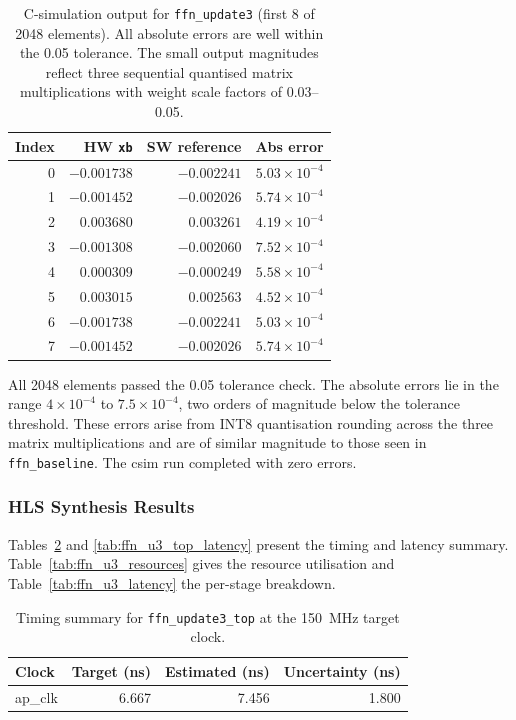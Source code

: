 \begin{table}[H]
  \centering
  \begin{tabular}{rrrr}
    \toprule
    Index & HW \texttt{xb} & SW reference & Abs error \\
    \midrule
    0 & $-0.001738$ & $-0.002241$ & $5.03 \times 10^{-4}$ \\
    1 & $-0.001452$ & $-0.002026$ & $5.74 \times 10^{-4}$ \\
    2 & $ 0.003680$ & $ 0.003261$ & $4.19 \times 10^{-4}$ \\
    3 & $-0.001308$ & $-0.002060$ & $7.52 \times 10^{-4}$ \\
    4 & $ 0.000309$ & $-0.000249$ & $5.58 \times 10^{-4}$ \\
    5 & $ 0.003015$ & $ 0.002563$ & $4.52 \times 10^{-4}$ \\
    6 & $-0.001738$ & $-0.002241$ & $5.03 \times 10^{-4}$ \\
    7 & $-0.001452$ & $-0.002026$ & $5.74 \times 10^{-4}$ \\
    \bottomrule
  \end{tabular}
  \caption{C-simulation output for \texttt{ffn\_update3} (first 8 of 2048
           elements). All absolute errors are well within the
           \num{0.05} tolerance. The small output magnitudes reflect
           three sequential quantised matrix multiplications with weight
           scale factors of \num{0.03}--\num{0.05}.}
  \label{tab:ffn_u3_csim}
\end{table}

All 2048 elements passed the \num{0.05} tolerance check. The absolute errors
lie in the range $4 \times 10^{-4}$ to $7.5 \times 10^{-4}$, two orders of
magnitude below the tolerance threshold. These errors arise from INT8
quantisation rounding across the three matrix multiplications and are of
similar magnitude to those seen in \texttt{ffn\_baseline}. The csim run
completed with zero errors.

\subsubsection{HLS Synthesis Results}
\label{subsubsec:ffn_update3_csyn}

Tables~\ref{tab:ffn_u3_timing} and \ref{tab:ffn_u3_top_latency}
present the timing and latency summary. Table~\ref{tab:ffn_u3_resources}
gives the resource utilisation and Table~\ref{tab:ffn_u3_latency} the
per-stage breakdown.

\begin{table}[H]
  \centering
  \begin{tabular}{lrrr}
    \toprule
    Clock & Target (ns) & Estimated (ns) & Uncertainty (ns) \\
    \midrule
    ap\_clk & 6.667 & 7.456 & 1.800 \\
    \bottomrule
  \end{tabular}
  \caption{Timing summary for \texttt{ffn\_update3\_top} at the
           \SI{150}{\mega\hertz} target clock.}
  \label{tab:ffn_u3_timing}
\end{table}

